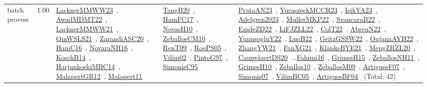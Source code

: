 {\begin{longtable}{p{3cm}r>{\raggedright\arraybackslash}p{6cm}>{\raggedright\arraybackslash}p{6cm}>{\raggedright\arraybackslash}p{8cm}}
\index{batch process}\index{Concepts!batch process}batch process &  1.00 & \href{../works/LacknerMMWW23.pdf}{LacknerMMWW23}~\cite{LacknerMMWW23}, \href{../works/AwadMDMT22.pdf}{AwadMDMT22}~\cite{AwadMDMT22}, \href{../works/LacknerMMWW21.pdf}{LacknerMMWW21}~\cite{LacknerMMWW21}, \href{../works/QinWSLS21.pdf}{QinWSLS21}~\cite{QinWSLS21}, \href{../works/ZarandiASC20.pdf}{ZarandiASC20}~\cite{ZarandiASC20}, \href{../works/HamC16.pdf}{HamC16}~\cite{HamC16}, \href{../works/NovaraNH16.pdf}{NovaraNH16}~\cite{NovaraNH16}, \href{../works/KoschB14.pdf}{KoschB14}~\cite{KoschB14}, \href{../works/HarjunkoskiMBC14.pdf}{HarjunkoskiMBC14}~\cite{HarjunkoskiMBC14}, \href{../works/MalapertGR12.pdf}{MalapertGR12}~\cite{MalapertGR12}, \href{../works/Malapert11.pdf}{Malapert11}~\cite{Malapert11} & \href{../works/TangB20.pdf}{TangB20}~\cite{TangB20}, \href{../works/HamFC17.pdf}{HamFC17}~\cite{HamFC17}, \href{../works/NovasH10.pdf}{NovasH10}~\cite{NovasH10}, \href{../works/ZeballosCM10.pdf}{ZeballosCM10}~\cite{ZeballosCM10}, \href{../works/RenT09.pdf}{RenT09}~\cite{RenT09}, \href{../works/RoePS05.pdf}{RoePS05}~\cite{RoePS05}, \href{../works/Vilim02.pdf}{Vilim02}~\cite{Vilim02}, \href{../works/PintoG97.pdf}{PintoG97}~\cite{PintoG97}, \href{../works/SimonisC95.pdf}{SimonisC95}~\cite{SimonisC95} & \href{../works/PrataAN23.pdf}{PrataAN23}~\cite{PrataAN23}, \href{../works/YuraszeckMCCR23.pdf}{YuraszeckMCCR23}~\cite{YuraszeckMCCR23}, \href{../works/IsikYA23.pdf}{IsikYA23}~\cite{IsikYA23}, \href{../works/Adelgren2023.pdf}{Adelgren2023}~\cite{Adelgren2023}, \href{../works/MullerMKP22.pdf}{MullerMKP22}~\cite{MullerMKP22}, \href{../works/SvancaraB22.pdf}{SvancaraB22}~\cite{SvancaraB22}, \href{../works/EmdeZD22.pdf}{EmdeZD22}~\cite{EmdeZD22}, \href{../works/LiFJZLL22.pdf}{LiFJZLL22}~\cite{LiFJZLL22}, \href{../works/ColT22.pdf}{ColT22}~\cite{ColT22}, \href{../works/AbreuN22.pdf}{AbreuN22}~\cite{AbreuN22}, \href{../works/YunusogluY22.pdf}{YunusogluY22}~\cite{YunusogluY22}, \href{../works/LuoB22.pdf}{LuoB22}~\cite{LuoB22}, \href{../works/GeitzGSSW22.pdf}{GeitzGSSW22}~\cite{GeitzGSSW22}, \href{../works/OujanaAYB22.pdf}{OujanaAYB22}~\cite{OujanaAYB22}, \href{../works/ZhangYW21.pdf}{ZhangYW21}~\cite{ZhangYW21}, \href{../works/FanXG21.pdf}{FanXG21}~\cite{FanXG21}, \href{../works/KlankeBYE21.pdf}{KlankeBYE21}~\cite{KlankeBYE21}, \href{../works/MengZRZL20.pdf}{MengZRZL20}~\cite{MengZRZL20}, \href{../works/CauwelaertDS20.pdf}{CauwelaertDS20}~\cite{CauwelaertDS20}...\href{../works/Fahimi16.pdf}{Fahimi16}~\cite{Fahimi16}, \href{../works/GrimesH15.pdf}{GrimesH15}~\cite{GrimesH15}, \href{../works/ZeballosNH11.pdf}{ZeballosNH11}~\cite{ZeballosNH11}, \href{../works/GrimesH10.pdf}{GrimesH10}~\cite{GrimesH10}, \href{../works/Zeballos10.pdf}{Zeballos10}~\cite{Zeballos10}, \href{../works/ZeballosM09.pdf}{ZeballosM09}~\cite{ZeballosM09}, \href{../works/ArtiguesF07.pdf}{ArtiguesF07}~\cite{ArtiguesF07}, \href{../works/Simonis07.pdf}{Simonis07}~\cite{Simonis07}, \href{../works/VilimBC05.pdf}{VilimBC05}~\cite{VilimBC05}, \href{../works/ArtiguesBF04.pdf}{ArtiguesBF04}~\cite{ArtiguesBF04} (Total: 42)\\

\end{longtable}}
